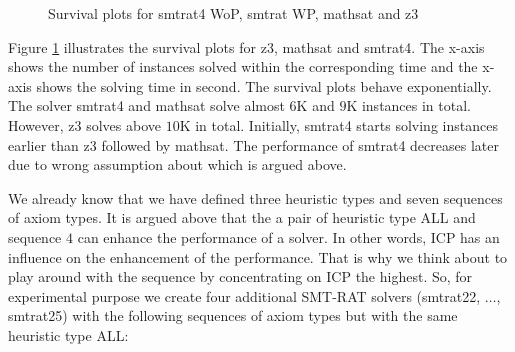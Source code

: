 \begin{figure}
\caption{Survival plots for smtrat4 WoP, smtrat WP, mathsat and z3} 
\label{fig:Survival_plots_smtrat4} 
\end{figure}

\noindent Figure \ref{fig:Survival_plots_smtrat4} illustrates the survival plots for z3, mathsat and smtrat4.
The x-axis shows the number of instances solved within the corresponding time and the x-axis shows the solving time in second.
The survival plots behave exponentially.
The solver smtrat4 and mathsat solve almost $6$K and $9$K instances in total.
However, z3 solves above $10$K in total.
Initially, smtrat4 starts solving instances earlier than z3 followed by mathsat.
The performance of smtrat4 decreases later due to wrong assumption about which is argued above.\newline

\noindent We already know that we have defined three heuristic types and seven sequences of axiom types.
It is argued above that the a pair of heuristic type ALL and sequence $4$ can enhance the performance of a solver.
In other words, ICP has an influence on the enhancement of the performance.
That is why we think about to play around with the sequence by concentrating on ICP the highest.
So, for experimental purpose we create four additional SMT-RAT solvers (smtrat22, $\dots$, smtrat25) with the following sequences of axiom types but with the same heuristic type ALL:

